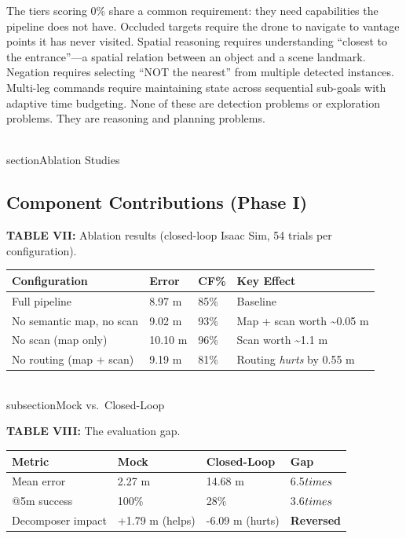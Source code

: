 \documentclass[conference]{IEEEtran}
\begin{document}
The tiers scoring 0\% share a common requirement: they need capabilities
the pipeline does not have. Occluded targets require the drone to
navigate to vantage points it has never visited. Spatial reasoning
requires understanding ``closest to the entrance''---a spatial relation
between an object and a scene landmark. Negation requires selecting
``NOT the nearest'' from multiple detected instances. Multi-leg commands
require maintaining state across sequential sub-goals with adaptive time
budgeting. None of these are detection problems or exploration problems.
They are reasoning and planning problems.

\\section{Ablation Studies}\label{vii.-ablation-studies}

\subsection{Component Contributions (Phase I)}\label{a.-component-contributions-phase-i}

\textbf{TABLE VII:} Ablation results (closed-loop Isaac Sim, 54 trials
per configuration).

{\def\LTcaptype{none} %
\begin{longtable}[]{@{}llll@{}}
\toprule\noalign{}
Configuration & Error & CF\% & Key Effect \\
\midrule\noalign{}
\endhead
\bottomrule\noalign{}
\endlastfoot
Full pipeline & 8.97 m & 85\% & Baseline \\
No semantic map, no scan & 9.02 m & 93\% & Map + scan worth
\textasciitilde0.05 m \\
No scan (map only) & 10.10 m & 96\% & Scan worth \textasciitilde1.1 m \\
No routing (map + scan) & 9.19 m & 81\% & Routing \emph{hurts} by 0.55
m \\
\end{longtable}
}

\\subsection{Mock vs.~Closed-Loop}\label{b.-mock-vs.-closed-loop}

\textbf{TABLE VIII:} The evaluation gap.

{\def\LTcaptype{none} %
\begin{longtable}[]{@{}llll@{}}
\toprule\noalign{}
Metric & Mock & Closed-Loop & Gap \\
\midrule\noalign{}
\endhead
\bottomrule\noalign{}
\endlastfoot
Mean error & 2.27 m & 14.68 m & 6.5$\\times$ \\
@5m success & 100\% & 28\% & 3.6$\\times$ \\
Decomposer impact & +1.79 m (helps) & -6.09 m (hurts) &
\textbf{Reversed} \\
\end{longtable}
}
\end{document}
